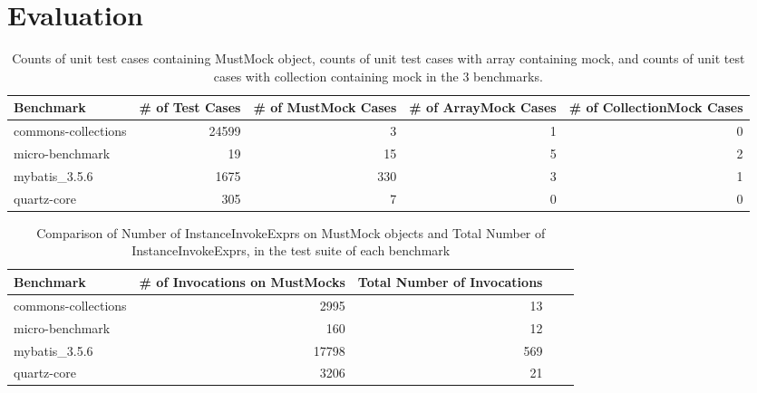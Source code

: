 \section{Evaluation}
\label{sec:evaluation}

\begin{table*}[b]
	\centering
	\caption{Counts of unit test cases containing MustMock object, counts of unit test cases with array containing mock, and counts of unit test cases with collection containing mock in the 3 benchmarks.}
	\begin{tabular}{lrrrr}
		\toprule
		Benchmark & \# of Test Cases & \# of MustMock Cases  & \# of ArrayMock Cases & \# of CollectionMock Cases \\
		\midrule
		commons-collections           			&  24599       &  3   & 1 & 0       \\
		micro-benchmark         		  		&  19    &  15   & 5 & 2       \\
		mybatis\_3.5.6         		  		&  1675    &  330   & 3 & 1       \\
		
		quartz-core         	  			&  305     &  7   & 0 & 0      \\
		\bottomrule
	\end{tabular}
	\label{tab:mocks}
\end{table*}

\begin{table*}[b]
	\centering
	\caption{Comparison of Number of InstanceInvokeExprs on MustMock objects and Total Number of InstanceInvokeExprs, in the test suite of each benchmark}
	\begin{tabular}{lrrrr}
		\toprule
		Benchmark & \# of Invocations on MustMocks & Total Number of Invocations \\
		\midrule
		commons-collections           			&  2995       &  13      \\
		micro-benchmark         		  		& 160 & 12       \\
		mybatis\_3.5.6         		  		&  17798    &  569       \\
		
		quartz-core         	  			&  3206     &  21      \\
		\bottomrule
	\end{tabular}
	\label{tab:mocks}
\end{table*}

